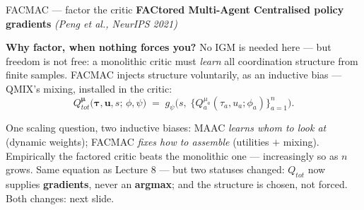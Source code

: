 \documentclass[10pt, aspectratio=169]{beamer}
\newcommand{\paper}[1]{\textcolor{mLightBrown}{\small\textit{(#1)}}}
\begin{document}
\begin{frame}{FACMAC --- factor the critic}
\textbf{FACtored Multi-Agent Centralised policy gradients} \paper{Peng et al., NeurIPS 2021}
\smallskip

\textbf{Why factor, when nothing forces you?} No IGM is needed here --- but freedom is not free: a monolithic critic must \emph{learn} all coordination structure from finite samples. FACMAC injects structure \alert{voluntarily}, as an inductive bias --- QMIX's mixing, installed \alert{in the critic}:
\[
Q_{tot}^{\bm\mu}\big(\boldsymbol\tau, \mathbf{u}, s;\, \phi, \psi\big) \;=\; g_\psi\Big( s,\; \big\{ Q_a^{\mu_a}(\tau_a, u_a;\phi_a) \big\}_{a=1}^{n} \Big).
\]
\medskip
\begin{center}
\end{center}
\medskip

\smallskip
{\footnotesize\textcolor{mLightBrown}{One scaling question, two inductive biases: MAAC \emph{learns whom to look at} (dynamic weights); FACMAC \emph{fixes how to assemble} (utilities $+$ mixing). Empirically the factored critic beats the monolithic one --- increasingly so as $n$ grows.}}
\smallskip
\pause
Same equation as Lecture 8 --- but \alert{two statuses changed}: $Q_{tot}$ now supplies \textbf{gradients}, never an \textbf{argmax}; and the structure is \alert{chosen}, not forced. Both changes: next slide.
\end{frame}
\end{document}
